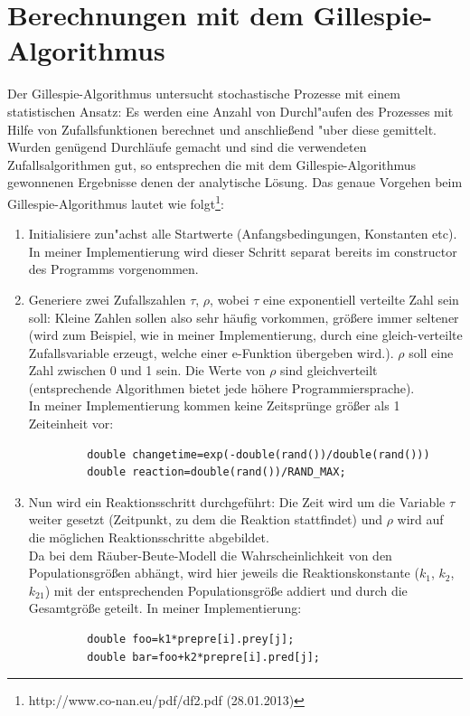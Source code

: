 \documentclass[11pt]{article}
\begin{document}
\section{Berechnungen mit dem Gillespie-Algorithmus}
Der Gillespie-Algorithmus untersucht stochastische Prozesse mit einem statistischen Ansatz: Es werden eine Anzahl von Durchl"aufen des Prozesses mit Hilfe von Zufallsfunktionen berechnet und anschließend "uber diese gemittelt. Wurden genügend Durchläufe gemacht und sind die verwendeten Zufallsalgorithmen gut, so entsprechen die mit dem Gillespie-Algorithmus gewonnenen Ergebnisse denen der analytische Lösung. Das genaue Vorgehen beim Gillespie-Algorithmus lautet wie folgt\footnote{http://www.co-nan.eu/pdf/df2.pdf (28.01.2013) }:
\begin{enumerate}
   \item Initialisiere zun"achst alle Startwerte (Anfangsbedingungen, Konstanten etc). In meiner Implementierung wird dieser Schritt separat bereits im constructor des Programms vorgenommen.
   \item Generiere zwei Zufallszahlen $\tau$, $\rho$, wobei $\tau$ eine exponentiell verteilte Zahl sein soll: Kleine Zahlen sollen also sehr häufig vorkommen, größere immer seltener (wird zum Beispiel, wie in meiner Implementierung, durch eine gleich-verteilte Zufallsvariable erzeugt, welche einer e-Funktion übergeben wird.). $\rho$ soll eine Zahl zwischen 0 und 1 sein. Die Werte von $\rho$ sind gleichverteilt (entsprechende Algorithmen bietet jede höhere Programmiersprache).\\
    In meiner Implementierung kommen keine Zeitsprünge größer als 1 Zeiteinheit vor:
         \begin{verbatim}
         double changetime=exp(-double(rand())/double(rand()))
         double reaction=double(rand())/RAND_MAX;\end{verbatim}
   \item Nun wird ein Reaktionsschritt durchgeführt: Die Zeit wird um die Variable $\tau$ weiter gesetzt (Zeitpunkt, zu dem die Reaktion stattfindet) und $\rho$ wird auf die möglichen Reaktionsschritte abgebildet. \\
   Da bei dem Räuber-Beute-Modell die Wahrscheinlichkeit von den Populationsgrößen abhängt, wird hier jeweils die Reaktionskonstante ($k_1$, $k_2$, $k_{21}$) mit der entsprechenden Populationsgröße addiert und durch die Gesamtgröße geteilt. In meiner Implementierung:
        \begin{verbatim}
         double foo=k1*prepre[i].prey[j];
         double bar=foo+k2*prepre[i].pred[j];

\end{verbatim}
\end{enumerate}
\end{document}
